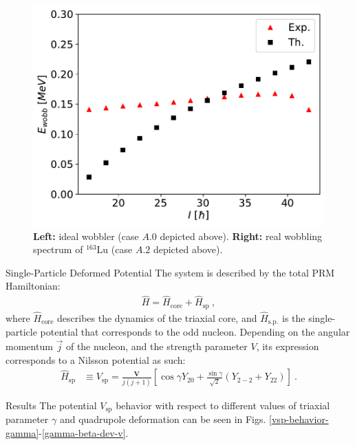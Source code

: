 \documentclass[final]{beamer}
\newlength{\colwidth}
\begin{document}
\begin{frame}[t]
\begin{columns}[t]
\begin{column}{\colwidth}
\begin{figure}
\begin{minipage}{.5\textwidth}
\end{minipage}%
\begin{minipage}{.5\textwidth}
  \centering
 \includegraphics[scale=0.95]{images/wobbling_energy_ThExp.pdf}
\end{minipage}
\caption{\textbf{Left:} ideal wobbler (case $A.0$ depicted above). \textbf{Right:} real wobbling spectrum of $^{163}$Lu (case $A.2$ depicted above).}
    \label{energy-function-min-point-evolution}
\end{figure}
  \begin{block}{Single-Particle Deformed Potential}
The system is described by the total PRM Hamiltonian:
\begin{align}
    \hat{H}=\hat{H}_\text{core}+\hat{H}_\text{sp}\ ,
\end{align}
where $\hat{H}_\text{core}$ describes the dynamics of the triaxial core, and $\hat{H}_\text{s.p.}$ is the single-particle potential that corresponds to the odd nucleon. Depending on the angular momentum $\vec{j}$ of the nucleon, and the strength parameter $V$, its expression corresponds to a Nilsson potential as such:
\begin{align}
\hat{H}_\text{sp}&\equiv V_\text{sp}=\frac{\mathbf{V}}{j(j+1)}\left[\cos\gamma Y_{20}+\frac{\sin\gamma}{\sqrt{2}}\left(Y_{2-2}+Y_{22}\right)\right]\ .
\end{align}
  \end{block}
    \begin{block}{Results}
  The potential $V_\text{sp}$ behavior with respect to different values of triaxial parameter $\gamma$ and quadrupole deformation can be seen in Figs. \ref{vsp-behavior-gamma}-\ref{gamma-beta-dev-v}.

\end{block}
\end{column}
\end{columns}
\end{frame}
\end{document}
